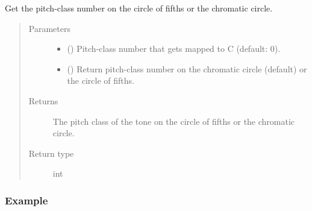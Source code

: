 \documentclass[letterpaper,10pt,english]{sphinxmanual}
\begin{document}
\begin{fulllineitems}
\begin{fulllineitems}
\end{fulllineitems}


\begin{fulllineitems}
\label{\detokenize{api:main.Tone.get_pitch_class}}
Get the pitch-class number on the circle of fifths or the chromatic circle.
\begin{quote}\begin{description}
\item[{Parameters}] \leavevmode\begin{itemize}
\item {} 
 () \textendash{} Pitch-class number that gets mapped to C (default: 0).

\item {} 
 () \textendash{} Return pitch-class number on the chromatic circle (default) or the circle of fifths.

\end{itemize}

\item[{Returns}] \leavevmode
The pitch class of the tone on the circle of fifths or the chromatic circle.

\item[{Return type}] \leavevmode
int

\end{description}\end{quote}
\subsubsection*{Example}

\begin{sphinxVerbatim}[commandchars=\\\{\}]
   
\end{sphinxVerbatim}


\end{fulllineitems}
\end{fulllineitems}
\end{document}

